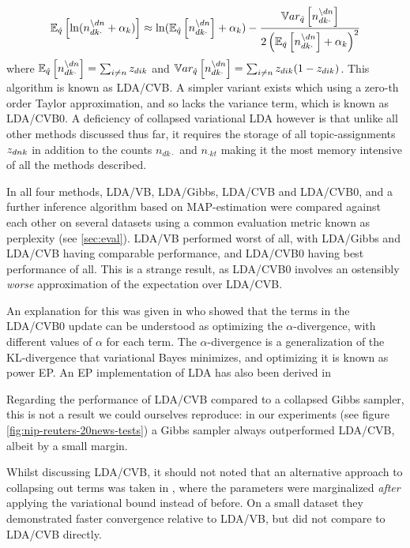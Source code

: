 \begin{align}
\ex{\ln (n_{dk\cdot}^{\setminus dn} + \alpha_k )}{\hat{q}} 
\approx 
\ln (\ex{n_{dk\cdot}^{\setminus dn}}{\hat{q}} + \alpha_k ) - \frac{\var{n_{dk\cdot}^{\setminus dn}}{\hat{q}}}{2\left( \ex{n_{dk\cdot}^{\setminus dn}}{\hat{q}} + \alpha_k \right)^2}
\end{align}
where $\ex{n_{dk\cdot}^{\setminus dn}}{\hat{q}} = \sum_{i \neq n} z_{dik}$ and $\var{n_{dk\cdot}^{\setminus dn}}{\hat{q}} = \sum_{i \neq n} z_{dik}(1 - z_{dik})$. This algorithm is known as LDA/CVB. A simpler variant exists which using a zero-th order Taylor approximation, and so lacks the variance term, which is known as LDA/CVB0. A deficiency of collapsed variational LDA however is that unlike all other methods discussed thus far, it requires the storage of all topic-assignments $\zdnk$ in addition to the counts $n_{dk\cdot}$ and $n_{\cdot kt}$ making it the most memory intensive of all the methods described.

In \cite{Asuncion2012} all four methods, LDA/VB, LDA/Gibbs, LDA/CVB and LDA/CVB0, and a further inference algorithm based on MAP-estimation were compared against each other on several datasets using a common evaluation metric known as perplexity (see \ref{sec:eval}). LDA/VB performed worst of all, with LDA/Gibbs and LDA/CVB having comparable performance, and LDA/CVB0 having best performance of all. This is a strange result, as LDA/CVB0 involves an ostensibly \emph{worse} approximation of the expectation over LDA/CVB. 

An explanation for this was given in\cite{Sato2012} who showed that the terms in the LDA/CVB0 update can be understood as optimizing the $\alpha$-divergence\cite{Minka2005}, with different values of $\alpha$ for each term. The $\alpha$-divergence is a generalization of the KL-divergence that variational Bayes minimizes, and optimizing it is known as power EP. An EP implementation of LDA has also been derived in \cite{Minka2002}

Regarding the performance of LDA/CVB compared to a collapsed Gibbs sampler, this is not a result we could ourselves reproduce: in our experiments (see figure \ref{fig:nip-reuters-20news-tests}) a Gibbs sampler always outperformed LDA/CVB, albeit by a small margin.

Whilst discussing LDA/CVB, it should not noted that an alternative approach to collapsing out terms was taken in \cite{Hensman2012}, where the parameters were marginalized \emph{after} applying the variational bound instead of before. On a small dataset they demonstrated faster convergence relative to LDA/VB, but did not compare to LDA/CVB directly.


